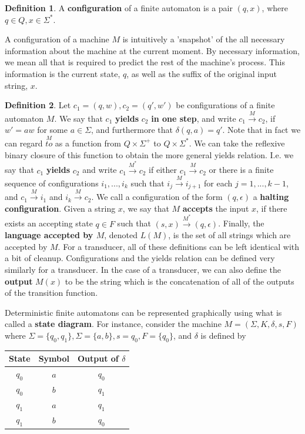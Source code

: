 \documentclass{article}
\theoremstyle{definition}
\newtheorem{definition}{Definition}[section]
\theoremstyle{plain}
\theoremstyle{theorem}
\begin{document}
\begin{definition}
	A \textbf{configuration} of a finite automaton is a pair $(q,x)$, where $q \in Q, x \in \Sigma^*$. 
\end{definition}
A configuration of a machine $M$ is intuitively a 'snapshot' of the all necessary information about the machine at the current moment. By necessary information, we mean all that is required to predict the rest of the machine's process. This information is the current state, $q$, as well as the suffix of the original input string, $x$. 
\begin{definition}
	Let $c_1=(q,w),c_2=(q',w')$ be configurations of a finite automaton $M$. We say that $c_1$ \textbf{yields} $c_2$ \textbf{in one step}, and write $c_1 \overset{M}{\to} c_2$, if $w' = aw$ for some $a\in \Sigma$, and furthermore that $\delta(q,a) = q'$. Note that in fact we can regard $\overset{M}{to}$ as a function from $Q \times \Sigma^+$ to $Q \times \Sigma^*$. We can take the reflexive binary closure of this function to obtain the more general yields relation. I.e. we say that $c_1$ \textbf{yields} $c_2$ and write $c_1 \overset{M^*}{\to} c_2$ if either $c_1 \overset{M}{\to} c_2$ or there is a finite sequence of configurations $i_1,...,i_k$ such that $i_j \overset{M}{\to} i_{j+1}$ for each $j =1,...,k-1$, and $c_1 \overset{M}{\to} i_1$ and $i_k \overset{M}{\to} c_2$. We call a configuration of the form $(q,\epsilon)$ a \textbf{halting configuration}. Given a string $x$, we say that $M$ \textbf{accepts} the input $x$, if there exists an accepting state $q \in F$ such that $(s,x) \overset{M^*}{\to} (q,\epsilon)$. Finally, the \textbf{language accepted by $M$}, denoted $L(M)$, is the set of all strings which are accepted by $M$. For a transducer, all of these definitions can be left identical with a bit of cleanup. Configurations and the yields relation can be defined very similarly for a transducer. In the case of a transducer, we can also define the \textbf{output} $M(x)$ to be the string which is the concatenation of all of the outputs of the transition function. 
\end{definition}
Deterministic finite automatons can be represented graphically using what is called a \textbf{state diagram}. For instance, consider the machine $M = (\Sigma,K,\delta,s,F)$ where $\Sigma = \{q_0,q_1\},\Sigma = \{a,b\},s = q_0,F = \{q_0\}$, and $\delta$ is defined by 
\begin{center}
\begin{tabular}{ |c c|c| } 
 \hline
 State & Symbol & Output of $\delta$ \\ 
 \hline
 $q_0$ & $a$ & $q_0$ \\ 
 $q_0$ & $b$ & $q_1$ \\ 
 $q_1$ & $a$ & $q_1$ \\
 $q_1$ & $b$ & $q_0$ \\
 \hline
\end{tabular}
\end{center} 
\end{document}
